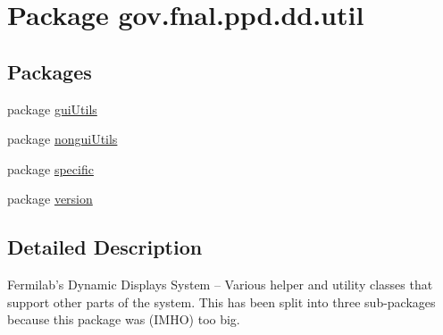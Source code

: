 \hypertarget{namespacegov_1_1fnal_1_1ppd_1_1dd_1_1util}{\section{Package gov.\-fnal.\-ppd.\-dd.\-util}
\label{namespacegov_1_1fnal_1_1ppd_1_1dd_1_1util}
}
\subsection*{Packages}
\begin{DoxyCompactItemize}
\item 
package \hyperlink{namespacegov_1_1fnal_1_1ppd_1_1dd_1_1util_1_1guiUtils}{gui\-Utils}
\item 
package \hyperlink{namespacegov_1_1fnal_1_1ppd_1_1dd_1_1util_1_1nonguiUtils}{nongui\-Utils}
\item 
package \hyperlink{namespacegov_1_1fnal_1_1ppd_1_1dd_1_1util_1_1specific}{specific}
\item 
package \hyperlink{namespacegov_1_1fnal_1_1ppd_1_1dd_1_1util_1_1version}{version}
\end{DoxyCompactItemize}


\subsection{Detailed Description}
Fermilab's Dynamic Displays System -- Various helper and utility classes that support other parts of the system. This has been split into three sub-\/packages because this package was (I\-M\-H\-O) too big. 